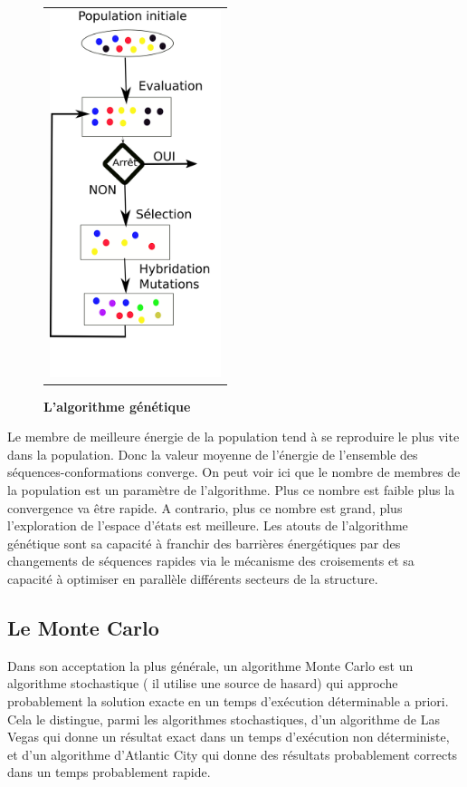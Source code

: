 \begin{figure}[!htbp]
  \centering
  \begin{tabular}{c}
    \includegraphics[width=5cm]{figure/algo_genetique.png} \\
  \end{tabular}
  \caption{\textbf{L'algorithme génétique}}
  \label{fig:algo_gene}
\end{figure}


Le membre de meilleure énergie de la population tend à se reproduire le plus vite dans la population. 
Donc la valeur moyenne de l'énergie de l'ensemble des séquences-conformations converge.
On peut voir ici que le nombre de membres de la population est un paramètre de l'algorithme. Plus ce nombre est faible plus la convergence va être rapide. A contrario, plus ce nombre est grand, plus l'exploration de l'espace d'états est meilleure. Les atouts de l'algorithme génétique sont sa capacité à franchir des barrières énergétiques par des changements de séquences rapides via le mécanisme des croisements et sa capacité à optimiser en parallèle différents secteurs de la structure.

\subsection{Le Monte Carlo}
\label{sub:MC}
Dans son acceptation la plus générale, un algorithme Monte Carlo est un algorithme stochastique ( il utilise une source de hasard) qui approche probablement la solution exacte en un temps d'exécution déterminable a priori. Cela le distingue, parmi les algorithmes stochastiques, d'un algorithme de Las Vegas qui donne un résultat exact dans un temps d'exécution non déterministe, et d'un algorithme d'Atlantic City qui donne des résultats probablement corrects dans un temps probablement rapide.

